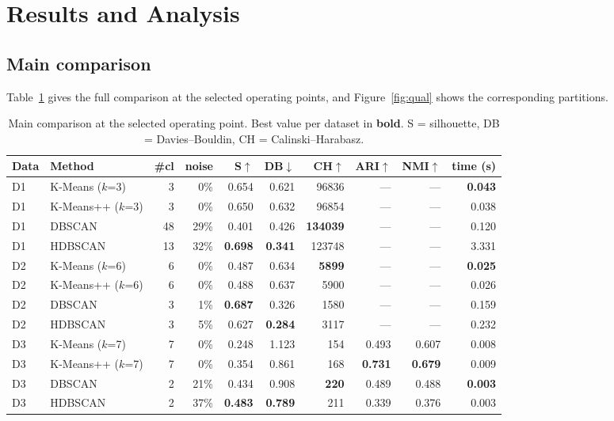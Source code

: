 \documentclass[11pt,a4paper]{article}
\begin{document}
\section{Results and Analysis}

\subsection{Main comparison}
Table~\ref{tab:main} gives the full comparison at the selected operating points,
and Figure~\ref{fig:qual} shows the corresponding partitions.

\begin{table}[h]\centering\small
\caption{Main comparison at the selected operating point. Best value per
dataset in \textbf{bold}. S = silhouette, DB = Davies--Bouldin,
CH = Calinski--Harabasz.}
\label{tab:main}
\begin{tabular}{llrrrrrrrr}
\toprule
\textbf{Data} & \textbf{Method} & \textbf{\#cl} & \textbf{noise} &
\textbf{S}$\uparrow$ & \textbf{DB}$\downarrow$ & \textbf{CH}$\uparrow$ &
\textbf{ARI}$\uparrow$ & \textbf{NMI}$\uparrow$ & \textbf{time (s)} \\
\midrule

D1 & K-Means ($k$=3)        & 3  & 0\%  & 0.654 & 0.621 & 96836 & --- & --- & \textbf{0.043} \\
D1 & K-Means++ ($k$=3)      & 3  & 0\%  & 0.650 & 0.632 & 96854 & --- & --- & 0.038 \\
D1 & DBSCAN                 & 48 & 29\% & 0.401 & 0.426 & \textbf{134039} & --- & --- & 0.120 \\
D1 & HDBSCAN                & 13 & 32\% & \textbf{0.698} & \textbf{0.341} & 123748 & --- & --- & 3.331 \\
\midrule
D2 & K-Means ($k$=6)        & 6 & 0\% & 0.487 & 0.634 & \textbf{5899} & --- & --- & \textbf{0.025} \\
D2 & K-Means++ ($k$=6)      & 6 & 0\% & 0.488 & 0.637 & 5900 & --- & --- & 0.026 \\
D2 & DBSCAN                 & 3 & 1\% & \textbf{0.687} & 0.326 & 1580 & --- & --- & 0.159 \\
D2 & HDBSCAN                & 3 & 5\% & 0.627 & \textbf{0.284} & 3117 & --- & --- & 0.232 \\
\midrule
D3 & K-Means ($k$=7)        & 7 & 0\%  & 0.248 & 1.123 & 154 & 0.493 & 0.607 & 0.008 \\
D3 & K-Means++ ($k$=7)      & 7 & 0\%  & 0.354 & 0.861 & 168 & \textbf{0.731} & \textbf{0.679} & 0.009 \\
D3 & DBSCAN                 & 2 & 21\% & 0.434 & 0.908 & \textbf{220} & 0.489 & 0.488 & \textbf{0.003} \\
D3 & HDBSCAN                & 2 & 37\% & \textbf{0.483} & \textbf{0.789} & 211 & 0.339 & 0.376 & 0.003 \\
\bottomrule
\end{tabular}
\end{table}
\end{document}
